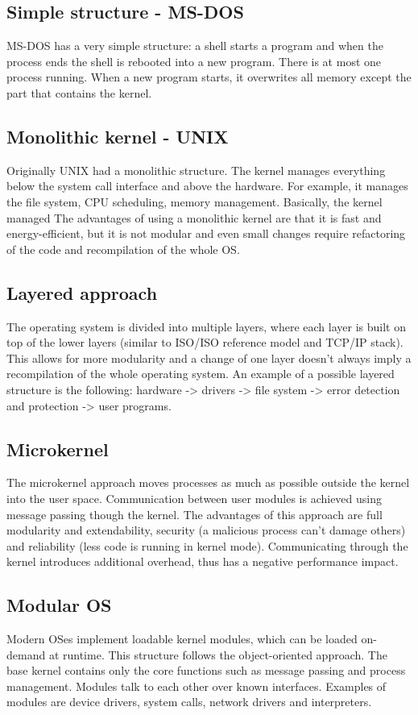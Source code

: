 \subsection{Simple structure - MS-DOS}
MS-DOS has a very simple structure: a shell starts a program and when the process ends the shell is rebooted into a new program. There is at most one process running. When a new program starts, it overwrites all memory except the part that contains the kernel.
\subsection{Monolithic kernel - UNIX}
Originally UNIX had a monolithic structure. The kernel manages everything below the system call interface and above the hardware. For example, it manages the file system, CPU scheduling, memory management. Basically, the kernel managed  The advantages of using a monolithic kernel are that it is fast and energy-efficient, but it is not modular and even small changes require refactoring of the code and recompilation of the whole OS.

\subsection{Layered approach}
The operating system is divided into multiple layers, where each layer is built on top of the lower layers (similar to ISO/ISO reference model and TCP/IP stack). This allows for more modularity and a change of one layer doesn't always imply a recompilation of the whole operating system. An example of a possible layered structure is the following: hardware -> drivers -> file system -> error detection and protection -> user programs.
\subsection{Microkernel}
The microkernel approach moves processes as much as possible outside the kernel into the user space. Communication between user modules is achieved using message passing though the kernel. The advantages of this approach are full modularity and extendability, security (a malicious process can't damage others) and reliability (less code is running in kernel mode). Communicating through the kernel introduces additional overhead, thus has a negative performance impact.
\subsection{Modular OS}
Modern OSes implement loadable kernel modules, which can be loaded on-demand at runtime. This structure follows the object-oriented approach. The base kernel contains only the core functions such as message passing and process management. Modules talk to each other over known interfaces. Examples of modules are device drivers, system calls, network drivers and interpreters.